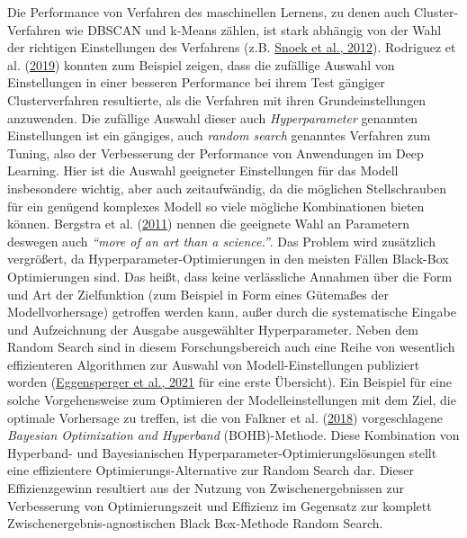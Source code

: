 \documentclass[
  12pt,
  openany]{book}
\begin{document}
Die Performance von Verfahren des maschinellen Lernens, zu denen auch Cluster-Verfahren wie DBSCAN und k-Means zählen, ist stark abhängig von der Wahl der richtigen Einstellungen des Verfahrens (z.B. \protect\hyperlink{ref-snoekPracticalBayesianOptimization2012}{Snoek et al., 2012}). Rodriguez et al. (\protect\hyperlink{ref-rodriguezClusteringAlgorithmsComparative2019a}{2019}) konnten zum Beispiel zeigen, dass die zufällige Auswahl von Einstellungen in einer besseren Performance bei ihrem Test gängiger Clusterverfahren resultierte, als die Verfahren mit ihren Grundeinstellungen anzuwenden.
Die zufällige Auswahl dieser auch \emph{Hyperparameter} genannten Einstellungen ist ein gängiges, auch \emph{random search} genanntes Verfahren zum Tuning, also der Verbesserung der Performance von Anwendungen im Deep Learning. Hier ist die Auswahl geeigneter Einstellungen für das Modell insbesondere wichtig, aber auch zeitaufwändig, da die möglichen Stellschrauben für ein genügend komplexes Modell so viele mögliche Kombinationen bieten können. Bergstra et al. (\protect\hyperlink{ref-bergstraAlgorithmsHyperParameterOptimization2011}{2011}) nennen die geeignete Wahl an Parametern deswegen auch \emph{``more of an art than a science.''}.
Das Problem wird zusätzlich vergrößert, da Hyperparameter-Optimierungen in den meisten Fällen Black-Box Optimierungen sind. Das heißt, dass keine verlässliche Annahmen über die Form und Art der Zielfunktion (zum Beispiel in Form eines Gütemaßes der Modellvorhersage) getroffen werden kann, außer durch die systematische Eingabe und Aufzeichnung der Ausgabe ausgewählter Hyperparameter. Neben dem Random Search sind in diesem Forschungsbereich auch eine Reihe von wesentlich effizienteren Algorithmen zur Auswahl von Modell-Einstellungen publiziert worden (\protect\hyperlink{ref-eggenspergerHPOBenchCollectionReproducible2021}{Eggensperger et al., 2021} für eine erste Übersicht).
Ein Beispiel für eine solche Vorgehensweise zum Optimieren der Modelleinstellungen mit dem Ziel, die optimale Vorhersage zu treffen, ist die von Falkner et al. (\protect\hyperlink{ref-falknerBOHBRobustEfficient2018}{2018}) vorgeschlagene \emph{Bayesian Optimization and Hyperband} (BOHB)-Methode. Diese Kombination von Hyperband- und Bayesianischen Hyperparameter-Optimierungslösungen stellt eine effizientere Optimierungs-Alternative zur Random Search dar. Dieser Effizienzgewinn resultiert aus der Nutzung von Zwischenergebnissen zur Verbesserung von Optimierungszeit und Effizienz im Gegensatz zur komplett Zwischenergebnis-agnostischen Black Box-Methode Random Search.
\end{document}
